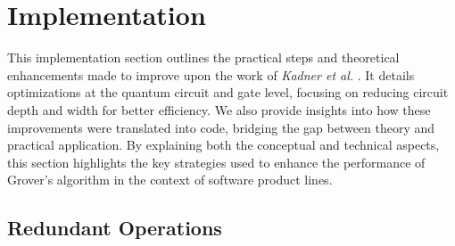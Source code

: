\section{Implementation}
This implementation section outlines the practical steps and theoretical enhancements made to improve upon the work of \textit{Kadner et al.} \cite{thesis-marwin-kadner}.
It details optimizations at the quantum circuit and gate level, focusing on reducing circuit depth and width for better efficiency. 
We also provide insights into how these improvements were translated into code, bridging the gap between theory and practical application. 
By explaining both the conceptual and technical aspects, this section highlights the key strategies used to enhance the performance of Grover’s algorithm in the context of software product lines.
\subsection{Redundant Operations}

\newcommand{\bm}[4]{\begin{bmatrix}#1&#2\\#3&#4\end{bmatrix}}
\newcommand{\Xgate}{\bm{0}{1}{1}{0}}
\newcommand{\Hgate}{-\frac{1}{\sqrt{2}}\bm{1}{1}{1}{-1}}

